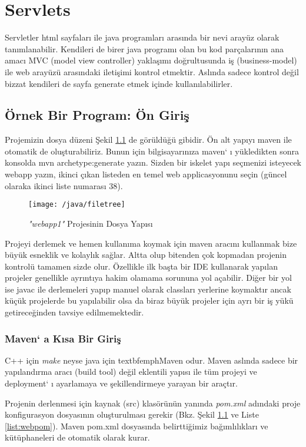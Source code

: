 \chapter{Servlets}
Servletler html sayfaları ile java programları arasında bir nevi arayüz olarak tanımlanabilir. Kendileri de birer java programı olan bu kod parçalarının ana amacı MVC (model view controller) yaklaşımı
doğrultusunda iş (business-model) ile web arayüzü arasındaki iletişimi kontrol etmektir. Aslında sadece kontrol değil bizzat kendileri de sayfa generate etmek içinde kullanılabilirler. 

\section{Örnek Bir Program: Ön Giriş}
Projemizin dosya düzeni Şekil \ref{fig:filetree} de görüldüğü gibidir. Ön alt yapıyı maven ile otomatik de oluşturabiliriz. Bunun için bilgisayarınıza maven` ı yükledikten sonra konsolda mvn archetype:generate yazın. Sizden bir iskelet yapı seçmenizi isteyecek webapp yazın, ikinci çıkan listeden en temel web applicasyonunu seçin (güncel olaraka ikinci liste numarası 38).
\begin{figure}[h]
\centering\texttt{[image: /java/filetree]}
\caption{\emph{"webapp1"} Projesinin Dosya Yapısı}
\label{fig:filetree}
\end{figure}
Projeyi derlemek ve hemen kullanıma koymak için maven aracını kullanmak bize büyük esneklik ve kolaylık sağlar. Altta olup bitenden çok kopmadan projenin kontrolü tamamen sizde olur. Özellikle ilk başta bir IDE kullanarak yapılan projeler genellikle ayrıntıya hakim olamama sorununa yol açabilir. 
Diğer bir yol ise javac ile derlemeleri yapıp manuel olarak classları yerlerine koymaktır ancak küçük projelerde bu yapılabilir olsa da biraz büyük projeler için ayrı bir iş yükü getireceğinden tavsiye edilmemektedir.

\subsection{Maven` a Kısa Bir Giriş}%
\label{sub:mavengiris}
C++ için \emph{make} neyse java için textbf{emph{Maven}} odur. Maven aslında  
sadece bir yapılandırma aracı (build tool) değil eklentili yapısı ile tüm projeyi
ve deployment` ı ayarlamaya ve şekillendirmeye yarayan bir araçtır.

Projenin derlenmesi için kaynak (src) klasörünün yanında \emph{pom.xml} adındaki
proje konfigurasyon dosyasının oluşturulması gerekir (Bkz. Şekil \ref{fig:filetree} ve Liste \ref{list:webpom}). Maven pom.xml dosyasında belirttiğimiz bağımlılıkları ve kütüphaneleri de otomatik olarak kurar.


